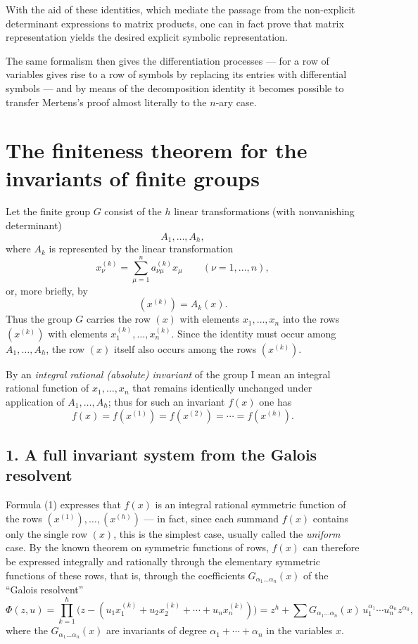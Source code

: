 \documentclass[11pt]{article}
\begin{document}
With the aid of these identities, which mediate the passage from the non-explicit determinant expressions to matrix products, one can in fact prove that matrix representation yields the desired explicit symbolic representation.

The same formalism then gives the differentiation processes --- for a row of variables gives rise to a row of symbols by replacing its entries with differential symbols --- and by means of the decomposition identity it becomes possible to transfer Mertens's proof almost literally to the $n$-ary case.

\clearpage
\section*{The finiteness theorem for the invariants of finite groups}

Let the finite group $G$ consist of the $h$ linear transformations (with nonvanishing determinant)
\[
A_1,\dots,A_h,
\]
where $A_k$ is represented by the linear transformation
\[
x^{(k)}_\nu=\sum_{\mu=1}^n a^{(k)}_{\nu\mu}x_\mu
\qquad (\nu=1,\dots,n),
\]
or, more briefly, by
\[
(x^{(k)})=A_k(x).
\]
Thus the group $G$ carries the row $(x)$ with elements $x_1,\dots,x_n$ into the rows $(x^{(k)})$ with elements $x^{(k)}_1,\dots,x^{(k)}_n$. Since the identity must occur among $A_1,\dots,A_h$, the row $(x)$ itself also occurs among the rows $(x^{(k)})$.

By an \emph{integral rational (absolute) invariant} of the group I mean an integral rational function of $x_1,\dots,x_n$ that remains identically unchanged under application of $A_1,\dots,A_h$; thus for such an invariant $f(x)$ one has
\[
f(x)=f(x^{(1)})=f(x^{(2)})=\cdots=f(x^{(h)}).
\tag{1}
\]

\subsection*{1. A full invariant system from the Galois resolvent}

Formula \textup{(1)} expresses that $f(x)$ is an integral rational symmetric function of the rows $(x^{(1)}),\dots,(x^{(h)})$ --- in fact, since each summand $f(x)$ contains only the single row $(x)$, this is the simplest case, usually called the \emph{uniform} case. By the known theorem on symmetric functions of rows, $f(x)$ can therefore be expressed integrally and rationally through the elementary symmetric functions of these rows, that is, through the coefficients $G_{\alpha_1\dots\alpha_n}(x)$ of the ``Galois resolvent''
\[
\Phi(z,u)=\prod_{k=1}^h\bigl(z-(u_1x^{(k)}_1+u_2x^{(k)}_2+\cdots+u_nx^{(k)}_n)\bigr)
      = z^h+\sum G_{\alpha_1\dots\alpha_n}(x)\,u_1^{\alpha_1}\cdots u_n^{\alpha_n} z^{\alpha_0},
\tag{2}
\]
where the $G_{\alpha_1\dots\alpha_n}(x)$ are invariants of degree $\alpha_1+\cdots+\alpha_n$ in the variables $x$.
\end{document}

